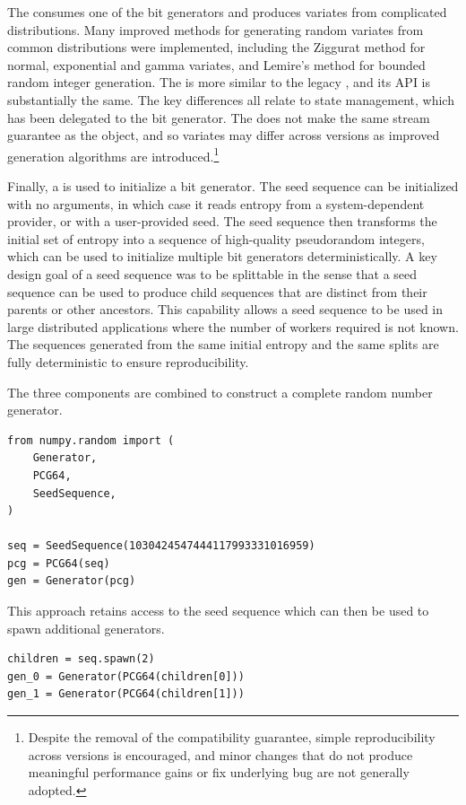 The  consumes one of the bit generators and produces variates
from complicated distributions. Many improved methods for generating random
variates from common distributions were implemented, including the Ziggurat
method for normal, exponential and gamma variates\cite{ziggurat}, and Lemire's
method for bounded random integer generation\cite{lemire}. The 
is more similar to the legacy , and its API is substantially
the same. The key differences all relate to state management, which has been
delegated to the bit generator. The  does not make the same
stream guarantee as the  object, and so variates may differ
across versions as improved generation algorithms are
introduced.\footnote{Despite the removal of the compatibility guarantee, simple
reproducibility across versions is encouraged, and minor changes that do not
produce meaningful performance gains or fix underlying bug are not generally
adopted.}

Finally, a  is used to initialize a bit generator. The seed
sequence can be initialized with no arguments, in which case it reads entropy
from a system-dependent provider, or with a user-provided seed. The seed
sequence then transforms the initial set of entropy into a sequence of
high-quality pseudorandom integers, which can be used to initialize multiple bit
generators deterministically. A key design goal of a seed sequence was to be
splittable in the sense that a seed sequence can be used to produce child
sequences that are distinct from their parents or other ancestors. This
capability allows a seed sequence to be used in large distributed applications
where the number of workers required is not known. The sequences generated from
the same initial entropy and the same splits are fully deterministic to ensure
reproducibility.

The three components are combined to construct a complete random number
generator.

\begin{lstlisting}
from numpy.random import (
    Generator,
    PCG64,
    SeedSequence,
)

seq = SeedSequence(1030424547444117993331016959)
pcg = PCG64(seq)
gen = Generator(pcg)
\end{lstlisting}

\noindent This approach retains access to the seed sequence which can then be
used to spawn additional generators.

\begin{lstlisting}
children = seq.spawn(2)
gen_0 = Generator(PCG64(children[0]))
gen_1 = Generator(PCG64(children[1]))
\end{lstlisting}

